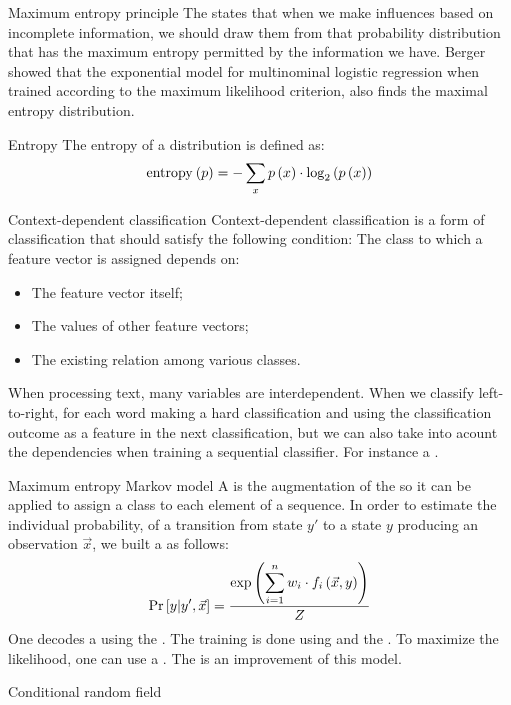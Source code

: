 \begin{df}{Maximum entropy principle}
The \sb{} states that when we make influences based on incomplete information, we should draw them from that probability distribution that has the maximum entropy permitted by the information we have. Berger showed that the exponential model for multinominal logistic regression when trained according to the maximum likelihood criterion, also finds the maximal entropy distribution.
\end{df}
\begin{df}{Entropy}
The entropy of a distribution is defined as:
\begin{equation}
\mbox{entropy}_{}\left(p\right)=-\displaystyle\sum_{x}p\left(x\right)\cdot\log_2\left(p\left(x\right)\right)
\end{equation}
\end{df}
\begin{df}{Context-dependent classification}
Context-dependent classification is a form of classification that should satisfy the following condition: The class to which a feature vector is assigned depends on:
\begin{itemize}
 \item The feature vector itself;
 \item The values of other feature vectors;
 \item The existing relation among various classes.
\end{itemize}
When processing text, many variables are interdependent. When we classify left-to-right, for each word making a hard classification and using the classification outcome as a feature in the next classification, but we can also take into acount the dependencies when training a sequential classifier. For instance a .
\end{df}
\begin{df}[MEMM]{Maximum entropy Markov model}
A \sb{} is the augmentation of the  so it can be applied to assign a class to each element of a sequence. In order to estimate the individual probability, of a transition from state $y'$ to a state $y$ producing an observation $\vec{x}$, we built a  as follows:
\begin{equation}
\Pr\left[y|y',\vec{x}\right]=\displaystyle\frac{\exp\left(\displaystyle\sum_{i=1}^n w_i\cdot f_i\left(\vec{x},y\right)\right)}{Z}
\end{equation}
One decodes a \sb{} using the . The training is done using  and the . To maximize the likelihood, one can use a . The  is an improvement of this model.
\end{df}
\begin{df}[CRF]{Conditional random field}

\end{df}